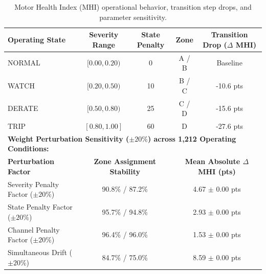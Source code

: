 \begin{table}[t]
\centering
\small
\caption{Motor Health Index (MHI) operational behavior, transition step drops, and parameter sensitivity.}
\label{tab:mhi_evaluation}
\begin{tabular}{lcccc}
\toprule
\textbf{Operating State} & \textbf{Severity Range} & \textbf{State Penalty} & \textbf{Zone} & \textbf{Transition Drop ($\Delta$ MHI)} \\
\midrule
NORMAL & $[0.00, 0.20)$ & 0 & A / B & Baseline \\
WATCH  & $[0.20, 0.50)$ & 10 & B / C & -10.6 pts \\
DERATE & $[0.50, 0.80)$ & 25 & C / D & -15.6 pts \\
TRIP   & $[0.80, 1.00]$ & 60 & D     & -27.6 pts \\
\midrule
\multicolumn{5}{l}{\textbf{Weight Perturbation Sensitivity ($\pm 20\%$) across 1,212 Operating Conditions:}} \\
\midrule
\textbf{Perturbation Factor} & \multicolumn{2}{c}{\textbf{Zone Assignment Stability}} & \multicolumn{2}{c}{\textbf{Mean Absolute $\Delta$ MHI (pts)}} \\
\midrule
Severity Penalty Factor ($\pm 20\%$) & \multicolumn{2}{c}{90.8\% / 87.2\%} & \multicolumn{2}{c}{4.67 $\pm$ 0.00 pts} \\
State Penalty Factor ($\pm 20\%$)    & \multicolumn{2}{c}{95.7\% / 94.8\%} & \multicolumn{2}{c}{2.93 $\pm$ 0.00 pts} \\
Channel Penalty Factor ($\pm 20\%$)  & \multicolumn{2}{c}{96.4\% / 96.0\%} & \multicolumn{2}{c}{1.53 $\pm$ 0.00 pts} \\
Simultaneous Drift ($\pm 20\%$)       & \multicolumn{2}{c}{84.7\% / 75.0\%} & \multicolumn{2}{c}{8.59 $\pm$ 0.00 pts} \\
\bottomrule
\end{tabular}
\end{table}
